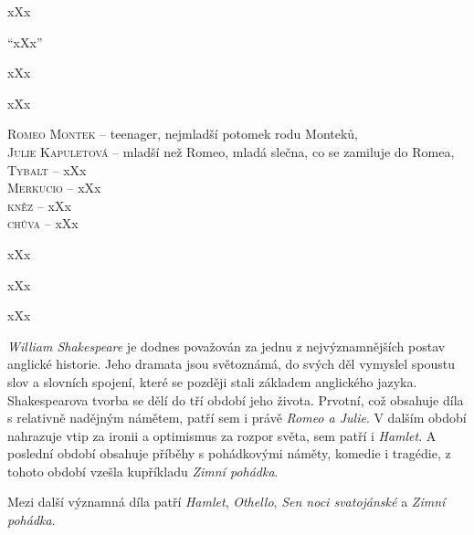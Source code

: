 \documentclass{extarticle} %
\begin{document}

\noindent xXx



\noindent 
\enquote{xXx}

\noindent 
xXx

\noindent 
xXx

\noindent 
\textsc{Romeo Montek --} teenager, nejmladší potomek rodu Monteků,  \\
\textsc{Julie Kapuletová --} mladší než Romeo, mladá slečna, co se zamiluje do Romea, \\
\textsc{Tybalt --} xXx \\
\textsc{Merkucio --} xXx \\
\textsc{kněz --} xXx \\
\textsc{chůva --} xXx

\noindent 
xXx

\noindent 
xXx

\noindent 
xXx






\noindent 
\textit{William Shakespeare} je dodnes považován za jednu z nejvýznamnějších postav anglické historie.
Jeho dramata jsou světoznámá, do svých děl vymyslel spoustu slov a slovních spojení,
které se později stali základem anglického jazyka. \\
Shakespearova tvorba se dělí do tří období jeho života.
Prvotní, což obsahuje díla s relativně nadějným námětem, patří sem i právě \textit{Romeo a Julie}.
V dalším období nahrazuje vtip za ironii a optimismus za rozpor světa, sem patří i \textit{Hamlet}.
A poslední období obsahuje příběhy s pohádkovými náměty, komedie i tragédie,
z tohoto období vzešla kupříkladu \textit{Zimní pohádka}.

\noindent 
Mezi další významná díla patří \textit{Hamlet}, \textit{Othello}, \textit{Sen noci svatojánské}
a \textit{Zimní pohádka}.
\end{document}
